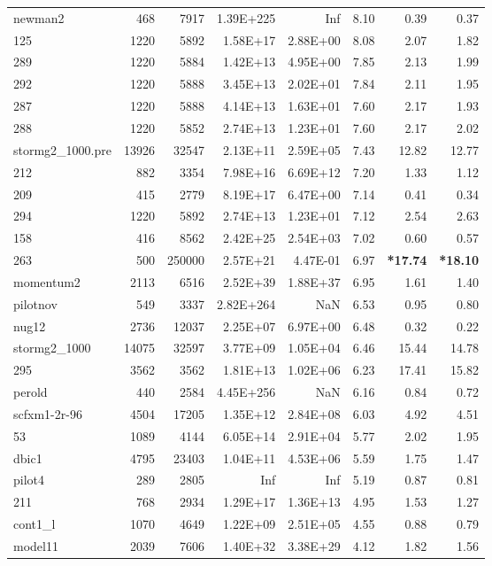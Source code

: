 \documentclass[10pt]{article}
\newcommand{\red}{
	\color{red}	
	}
\begin{document}
\begin{longtable}{|l|r|r|r|r|r|r|r|}
newman2	&	468	&	7917	&	1.39E+225	&	Inf	&	8.10	&	0.39	&	0.37	\\
125	&	1220	&	5892	&	1.58E+17	&	2.88E+00	&	8.08	&	2.07	&	1.82	\\
289	&	1220	&	5884	&	1.42E+13	&	4.95E+00	&	7.85	&	2.13	&	1.99	\\
292	&	1220	&	5888	&	3.45E+13	&	2.02E+01	&	7.84	&	2.11	&	1.95	\\
287	&	1220	&	5888	&	4.14E+13	&	1.63E+01	&	7.60	&	2.17	&	1.93	\\
288	&	1220	&	5852	&	2.74E+13	&	1.23E+01	&	7.60	&	2.17	&	2.02	\\
stormg2\_1000.pre	&	13926	&	32547	&	2.13E+11	&	2.59E+05	&	7.43	&	12.82	&	12.77	\\
212	&	882	&	3354	&	7.98E+16	&	6.69E+12	&	7.20	&	1.33	&	1.12	\\
209	&	415	&	2779	&	8.19E+17	&	6.47E+00	&	7.14	&	0.41	&	0.34	\\
294	&	1220	&	5892	&	2.74E+13	&	1.23E+01	&	7.12	&	2.54	&	2.63	\\
158	&	416	&	8562	&	2.42E+25	&	2.54E+03	&	7.02	&	0.60	&	0.57	\\
263	&	500	&	250000	&	2.57E+21	&	4.47E-01	&	6.97	&	{\bf \red *17.74}	&	{\bf \red *18.10} 	\\
momentum2	&	2113	&	6516	&	2.52E+39	&	1.88E+37	&	6.95	&	1.61	&	1.40	\\
pilotnov	&	549	&	3337	&	2.82E+264	&	NaN	&	6.53	&	0.95	&	0.80	\\
nug12	&	2736	&	12037	&	2.25E+07	&	6.97E+00	&	6.48	&	0.32	&	0.22	\\
stormg2\_1000	&	14075	&	32597	&	3.77E+09	&	1.05E+04	&	6.46	&	15.44	&	14.78	\\
295	&	3562	&	3562	&	1.81E+13	&	1.02E+06	&	6.23	&	17.41	&	15.82	\\
perold	&	440	&	2584	&	4.45E+256	&	NaN	&	6.16	&	0.84	&	0.72	\\
scfxm1-2r-96	&	4504	&	17205	&	1.35E+12	&	2.84E+08	&	6.03	&	4.92	&	4.51	\\
53	&	1089	&	4144	&	6.05E+14	&	2.91E+04	&	5.77	&	2.02	&	1.95	\\
dbic1	&	4795	&	23403	&	1.04E+11	&	4.53E+06	&	5.59	&	1.75	&	1.47	\\
pilot4	&	289	&	2805	&	Inf	&	Inf	&	5.19	&	0.87	&	0.81	\\
211	&	768	&	2934	&	1.29E+17	&	1.36E+13	&	4.95	&	1.53	&	1.27	\\
cont1\_l	&	1070	&	4649	&	1.22E+09	&	2.51E+05	&	4.55	&	0.88	&	0.79	\\
model11	&	2039	&	7606	&	1.40E+32	&	3.38E+29	&	4.12	&	1.82	&	1.56	\\

\end{longtable}
\end{document}
